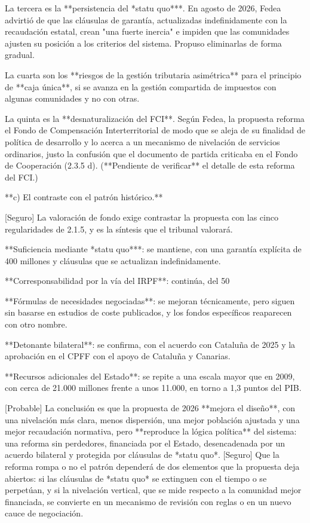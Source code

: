 \documentclass[10pt,a4paper]{article}
\begin{document}
La tercera es la **persistencia del *statu quo***. En agosto de 2026, Fedea advirtió de que las cláusulas de garantía, actualizadas indefinidamente con la recaudación estatal, crean "una fuerte inercia" e impiden que las comunidades ajusten su posición a los criterios del sistema. Propuso eliminarlas de forma gradual.

La cuarta son los **riesgos de la gestión tributaria asimétrica** para el principio de **caja única**, si se avanza en la gestión compartida de impuestos con algunas comunidades y no con otras.

La quinta es la **desnaturalización del FCI**. Según Fedea, la propuesta reforma el Fondo de Compensación Interterritorial de modo que se aleja de su finalidad de política de desarrollo y lo acerca a un mecanismo de nivelación de servicios ordinarios, justo la confusión que el documento de partida criticaba en el Fondo de Cooperación (2.3.5 d). (**Pendiente de verificar** el detalle de esta reforma del FCI.)

**c) El contraste con el patrón histórico.**

[Seguro] La valoración de fondo exige contrastar la propuesta con las cinco regularidades de 2.1.5, y es la síntesis que el tribunal valorará.

**Suficiencia mediante *statu quo***: se mantiene, con una garantía explícita de 400 millones y cláusulas que se actualizan indefinidamente.

**Corresponsabilidad por la vía del IRPF**: continúa, del 50%

**Fórmulas de necesidades negociadas**: se mejoran técnicamente, pero siguen sin basarse en estudios de coste publicados, y los fondos específicos reaparecen con otro nombre.

**Detonante bilateral**: se confirma, con el acuerdo con Cataluña de 2025 y la aprobación en el CPFF con el apoyo de Cataluña y Canarias.

**Recursos adicionales del Estado**: se repite a una escala mayor que en 2009, con cerca de 21.000 millones frente a unos 11.000, en torno a 1,3 puntos del PIB.

[Probable] La conclusión es que la propuesta de 2026 **mejora el diseño**, con una nivelación más clara, menos dispersión, una mejor población ajustada y una mejor recaudación normativa, pero **reproduce la lógica política** del sistema: una reforma sin perdedores, financiada por el Estado, desencadenada por un acuerdo bilateral y protegida por cláusulas de *statu quo*. [Seguro] Que la reforma rompa o no el patrón dependerá de dos elementos que la propuesta deja abiertos: si las cláusulas de *statu quo* se extinguen con el tiempo o se perpetúan, y si la nivelación vertical, que se mide respecto a la comunidad mejor financiada, se convierte en un mecanismo de revisión con reglas o en un nuevo cauce de negociación.
\end{document}
